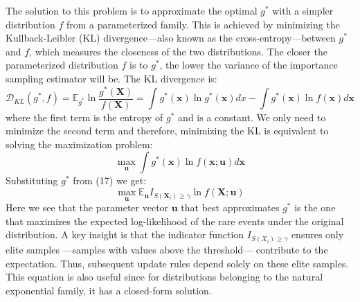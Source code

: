 \documentclass{article}
\begin{document}
The solution to this problem is to approximate the optimal $g^*$ with a simpler distribution $f$ from a parameterized family. This is achieved by minimizing the Kullback-Leibler (KL) divergence—also known as the cross-entropy—between $g^*$ and $f$, which measures the closeness of the two distributions. The closer the parameterized distribution $f$ is to $g^*$, the lower the variance of the importance sampling estimator will be.
The KL divergence is:
\begin{equation}
\mathcal{D}_{KL}(g^*,f) = \mathbb{E}_{g^*}\ln \frac{g^*(\mathbf{X})}{f(\mathbf{X})}=\int g^*(\mathbf{x})\ln g^*(\mathbf{x})dx- \int g^*(\mathbf{x})\ln f(\mathbf{x})d\mathbf{x}
\end{equation}
where the first term is the entropy of $g^*$ and is a constant. We only need to minimize the second term and therefore, minimizing the KL is  equivalent to solving the maximization problem:
\begin{equation}
\max_\mathbf{u} \int g^*(\mathbf{x})\ln f(\mathbf{x};\mathbf{u})d\mathbf{x} 
\end{equation}
Substituting $g^*$ from (17) we get:
\begin{equation}
\max_\mathbf{u}\mathbb{E}_\mathbf{u}I_{{S(\mathbf{X}_i) \geq \gamma}}\ln f(\mathbf{X};\mathbf{u})
\end{equation}
Here we see that the parameter vector $\mathbf{u}$ that best approximates $g^*$ is the one that maximizes the expected log-likelihood of the rare events under the original distribution. A key insight is that the indicator function $I_{S(X_i)\geq \gamma}$ ensures only elite samples —samples with values above the threshold— contribute to the expectation. Thus, subsequent update rules depend solely on these elite samples. This equation is also useful since for distributions belonging to the natural exponential family, it has a closed-form solution.
\end{document}
